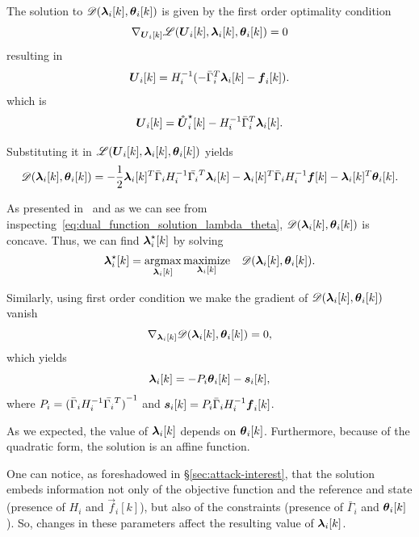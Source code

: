 \documentclass[../main.tex]{subfiles}
\begin{document}
The solution to $\dualfunction$ is given by the first order \KKT{} optimality condition
\begin{equation}
\nabla_{\vec{U}_{i}[k]}\lagrangian=0
\end{equation}
resulting in
\begin{equation}
\vec{U}_{i}[k]=H_{i}^{-1}(-\bar{\Gamma}_{i}^{T}\lambdaik-\vec{f}_{i}[k]).
\end{equation}
which is
\begin{equation}
\vec{U}_{i}[k]=\optuncUik-H_{i}^{-1}\bar{\Gamma}_{i}^{T}\lambdaik.
\end{equation}

Substituting it in $\lagrangian$ yields
\begin{equation}
  \label{eq:dual_function_solution_lambda_theta}
\dualfunction=-\frac{1}{2}\lambdaik^{T}\linearcoefi\lambdaik-\lambdaik^{T}\bar{\Gamma}_{i}H_{i}^{-1}\vec{f}[k]-\lambdaik^{T}\thetaik.
\end{equation}

As presented in~\cite{BoydVandenberghe2004} and as we can see from inspecting~\eqref{eq:dual_function_solution_lambda_theta}, $\dualfunction$ is concave. Thus, we can find $\lambdaikstar$ by solving
\begin{equation}
  \label{eq:eq_lambda_equation}
  \begin{matrix}
    \lambdaikstar=\argmax\limits_{\lambdaik}\maximize\limits_{\lambdaik}&\dualfunction.
  \end{matrix}
\end{equation}

Similarly, using first order \KKT{} condition we make the gradient of $\dualfunction$ vanish
\begin{equation}
\nabla_{\lambdaik}\dualfunction=0,
\end{equation}
which yields
\begin{equation}
  \label{eq:lambda_function_theta}
  \lambdaik=-\Plin\thetaik-\sik,
\end{equation}
where ${P}_{i}={(\bar{\Gamma}_{i}H_{i}^{-1}\bar{\Gamma_{i}}^{T})}^{-1}$ and $\boldsymbol{s}_{i}[k]={P}_{i}\bar{\Gamma}_{i}H_{i}^{-1}\boldsymbol{f}_{i}[k]$.

As we expected, the value of $\lambdaik$ depends on $\thetaik$.
Furthermore, because of the quadratic form, the solution is an affine function.

\begin{remark}
  One can notice, as foreshadowed in \S\ref{sec:attack-interest}, that the solution embeds information not only of the objective function and the reference and state (presence of $H_{i}$ and $\vec{f}_{i}[k]$), but also of the constraints (presence of $\bar{\Gamma}_{i}$ and $\thetaik$).
  So, changes in these parameters affect the resulting value of $\lambdaik$.
\end{remark}
\end{document}

